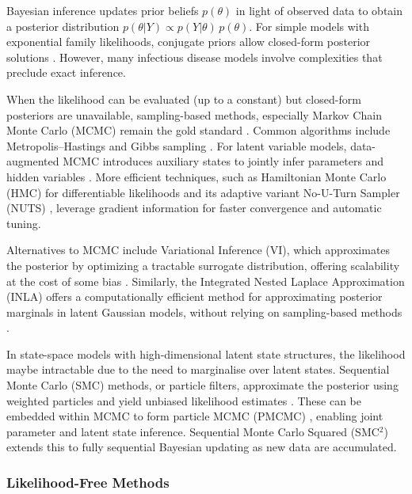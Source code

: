 \documentclass{article}
\begin{document}
Bayesian inference updates prior beliefs $ p(\theta)$ in light of observed data to obtain a posterior distribution $p(\theta | Y) \propto p(Y|\theta) \,p(\theta)$. For simple models with exponential family likelihoods, conjugate priors allow closed-form posterior solutions \citep{gelman1995bayesian,  cori2013new}. However, many infectious disease models involve complexities that preclude exact inference.

When the likelihood can be evaluated (up to a constant) but closed-form posteriors are unavailable, sampling-based methods, especially Markov Chain Monte Carlo (MCMC) remain the gold standard \citep{gilks1995markov, lekone2006statistical}. Common algorithms include Metropolis–Hastings \citep{hastings1970monte} and Gibbs sampling \citep{geman1984stochastic}. For latent variable models, data-augmented MCMC introduces auxiliary states to jointly infer parameters and hidden variables \citep{o1999bayesian}. More efficient techniques, such as Hamiltonian Monte Carlo (HMC) for differentiable likelihoods \citep{duane1987hybrid} and its adaptive variant No-U-Turn Sampler (NUTS) \citep{hoffman2014no, andrade2020evaluation}, leverage gradient information for faster convergence and automatic tuning. 

Alternatives to MCMC include Variational Inference (VI), which approximates the posterior by optimizing a tractable surrogate distribution, offering scalability at the cost of some bias \citep{blei2017variational, chatzilena2019contemporary}. Similarly, the Integrated Nested Laplace Approximation (INLA) 
offers a computationally efficient method for approximating posterior marginals in latent Gaussian models, without relying on sampling-based methods \citep{rue2017bayesian}.

In state-space models with high-dimensional latent state structures, the likelihood maybe intractable due to the need to marginalise over latent states. Sequential Monte Carlo (SMC) methods, or particle filters, approximate the posterior using weighted particles and yield unbiased likelihood estimates \citep{doucet2001introduction}. These can be embedded within MCMC to form particle MCMC (PMCMC) \citep{andrieu2010particle, endo2019introduction} , enabling joint parameter and latent state inference. Sequential Monte Carlo Squared (SMC$^2$) \citep{chopin2013smc2} extends this to fully sequential Bayesian updating as new data are accumulated.

\subsubsection{Likelihood-Free Methods}
\end{document}
